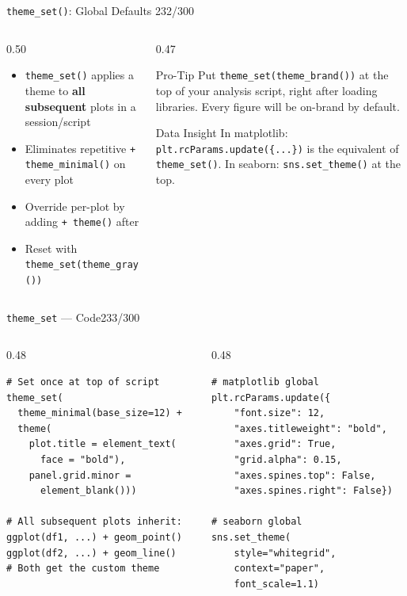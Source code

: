 \documentclass[10pt]{beamer}
\newcommand{\smark}[1]{\hfill{\scriptsize\color{codegray}#1}}
\begin{document}
\begin{frame}{\texttt{theme\_set()}: Global Defaults}
\smark{232/300}
\begin{columns}[T]
\begin{column}{0.50\textwidth}
\begin{itemize}
    \item \texttt{theme\_set()} applies a theme to \textbf{all subsequent} plots in a session/script
    \item Eliminates repetitive \texttt{+ theme\_minimal()} on every plot
    \item Override per-plot by adding \texttt{+ theme()} after
    \item Reset with \texttt{theme\_set(theme\_gray())}
\end{itemize}
\end{column}
\begin{column}{0.47\textwidth}
\begin{alertblock}{Pro-Tip}
    \scriptsize Put \texttt{theme\_set(theme\_brand())} at the top of your analysis script, right after loading libraries. Every figure will be on-brand by default.
\end{alertblock}
\vspace{0.2cm}
\begin{exampleblock}{Data Insight}
    \scriptsize In matplotlib: \texttt{plt.rcParams.update(\{...\})} is the equivalent of \texttt{theme\_set()}. In seaborn: \texttt{sns.set\_theme()} at the top.
\end{exampleblock}
\end{column}
\end{columns}
\end{frame}

\begin{frame}[fragile]{\texttt{theme\_set} --- Code}\smark{233/300}
\begin{columns}[T]
\begin{column}{0.48\textwidth}
\begin{lstlisting}[style=Rstyle]
# Set once at top of script
theme_set(
  theme_minimal(base_size=12) +
  theme(
    plot.title = element_text(
      face = "bold"),
    panel.grid.minor =
      element_blank()))

# All subsequent plots inherit:
ggplot(df1, ...) + geom_point()
ggplot(df2, ...) + geom_line()
# Both get the custom theme
\end{lstlisting}
\end{column}
\begin{column}{0.48\textwidth}
\begin{lstlisting}[style=Pystyle]
# matplotlib global
plt.rcParams.update({
    "font.size": 12,
    "axes.titleweight": "bold",
    "axes.grid": True,
    "grid.alpha": 0.15,
    "axes.spines.top": False,
    "axes.spines.right": False})

# seaborn global
sns.set_theme(
    style="whitegrid",
    context="paper",
    font_scale=1.1)
\end{lstlisting}
\end{column}
\end{columns}
\end{frame}
\end{document}
